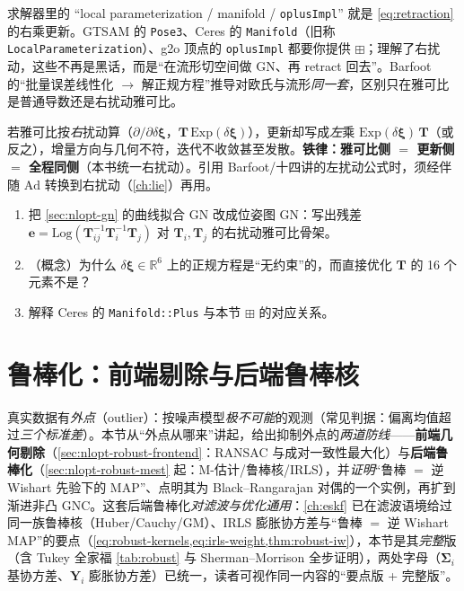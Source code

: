 \begin{insight}
求解器里的 “local parameterization / manifold / \texttt{oplusImpl}” 就是 \cref{eq:retraction} 的右乘更新。GTSAM 的 \texttt{Pose3}、Ceres 的 \texttt{Manifold}（旧称 \texttt{LocalParameterization}）、g2o 顶点的 \texttt{oplusImpl} 都要你提供 $\boxplus$；理解了右扰动，这些不再是黑话，而是“在流形切空间做 GN、再 retract 回去”。Barfoot\cite{barfoot2024state} 的“批量误差线性化 $\to$ 解正规方程”推导对欧氏与流形\emph{同一套}，区别只在雅可比是普通导数还是右扰动雅可比。
\end{insight}

\begin{pitfall}
若雅可比按\emph{右}扰动算（$\partial/\partial\delta\boldsymbol{\xi}$，$\mathbf{T}\,\mathrm{Exp}(\delta\boldsymbol{\xi})$），更新却写成\emph{左}乘 $\mathrm{Exp}(\delta\boldsymbol{\xi})\,\mathbf{T}$（或反之），增量方向与几何不符，迭代不收敛甚至发散。\textbf{铁律：雅可比侧 $=$ 更新侧 $=$ 全程同侧}（本书统一右扰动）。引用 Barfoot/十四讲的左扰动公式时，须经伴随 $\mathrm{Ad}$ 转换到右扰动（\cref{ch:lie}）再用。
\end{pitfall}

\begin{practice}
\begin{enumerate}
  \item 把 \cref{sec:nlopt-gn} 的曲线拟合 GN 改成位姿图 GN：写出残差 $\mathbf{e}=\mathrm{Log}(\mathbf{T}_{ij}^{-1}\mathbf{T}_i^{-1}\mathbf{T}_j)$ 对 $\mathbf{T}_i,\mathbf{T}_j$ 的右扰动雅可比骨架。
  \item （概念）为什么 $\delta\boldsymbol{\xi}\in\mathbb{R}^6$ 上的正规方程是“无约束”的，而直接优化 $\mathbf{T}$ 的 16 个元素不是？
  \item 解释 Ceres 的 \texttt{Manifold::Plus} 与本节 $\boxplus$ 的对应关系。
\end{enumerate}
\end{practice}

\section{鲁棒化：前端剔除与后端鲁棒核}
\label{sec:nlopt-robust}

真实数据有\emph{外点}（outlier）：按噪声模型\emph{极不可能}的观测（常见判据：偏离均值超过\emph{三个标准差}）\cite{barfoot2024state}。本节从“外点从哪来”讲起，给出抑制外点的\emph{两道防线}——\textbf{前端几何剔除}（\cref{sec:nlopt-robust-frontend}：RANSAC 与成对一致性最大化）与\textbf{后端鲁棒化}（\cref{sec:nlopt-robust-mest} 起：M-估计/鲁棒核/IRLS），并\emph{证明}“鲁棒 $=$ 逆 Wishart 先验下的 MAP”、点明其为 Black--Rangarajan 对偶的一个实例，再扩到渐进非凸 GNC。这套后端鲁棒化\emph{对滤波与优化通用}：\cref{ch:eskf} 已在滤波语境给过同一族鲁棒核（Huber/Cauchy/GM）、IRLS 膨胀协方差与“鲁棒 $=$ 逆 Wishart MAP”的要点（\cref{eq:robust-kernels,eq:irls-weight,thm:robust-iw}），本节是其\emph{完整}版（含 Tukey 全家福 \cref{tab:robust} 与 Sherman--Morrison 全步证明），两处字母（$\boldsymbol{\Sigma}_i$ 基协方差、$\mathbf{Y}_i$ 膨胀协方差）已统一，读者可视作同一内容的“要点版 + 完整版”。


